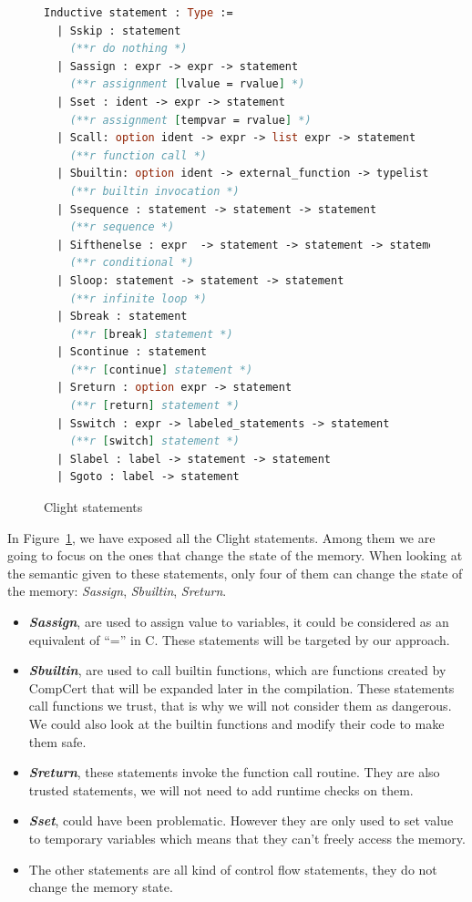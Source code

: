 \documentclass[11pt]{sdm}
\begin{document}
\begin{figure}[!ht]
\centering
\begin{lstlisting}[language=Caml]
Inductive statement : Type :=
  | Sskip : statement
    (**r do nothing *)
  | Sassign : expr -> expr -> statement
    (**r assignment [lvalue = rvalue] *)
  | Sset : ident -> expr -> statement 
    (**r assignment [tempvar = rvalue] *)
  | Scall: option ident -> expr -> list expr -> statement
    (**r function call *)
  | Sbuiltin: option ident -> external_function -> typelist -> list expr -> statement
    (**r builtin invocation *)
  | Ssequence : statement -> statement -> statement 
    (**r sequence *)
  | Sifthenelse : expr  -> statement -> statement -> statement
    (**r conditional *)
  | Sloop: statement -> statement -> statement 
    (**r infinite loop *)
  | Sbreak : statement   
    (**r [break] statement *)
  | Scontinue : statement
    (**r [continue] statement *)
  | Sreturn : option expr -> statement 
    (**r [return] statement *)
  | Sswitch : expr -> labeled_statements -> statement
    (**r [switch] statement *)
  | Slabel : label -> statement -> statement
  | Sgoto : label -> statement
\end{lstlisting}
\caption{Clight statements}
\label{clight_statements}
\end{figure}

In Figure~\ref{clight_statements}, we have exposed all the Clight statements. Among them we are going to focus on the ones that change the state of the memory. When looking at the semantic given to these statements, only four of them can change the state of the memory: \textit{Sassign}, \textit{Sbuiltin}, \textit{Sreturn}.

\begin{itemize}
	\item \textbf{\textit{Sassign}}, are used to assign value to variables, it could be considered as an equivalent of ``='' in C. These statements will be targeted by our approach.
	\item \textbf{\textit{Sbuiltin}}, are used to call builtin functions, which are functions created by CompCert that will be expanded later in the compilation. These statements call functions we trust, that is why we will not consider them as dangerous. We could also look at the builtin functions and modify their code to make them safe.
	\item \textbf{\textit{Sreturn}}, these statements invoke the function call routine. They are also trusted statements, we will not need to add runtime checks on them.
	\item \textbf{\textit{Sset}}, could have been problematic. However they are only used to set value to temporary variables which means that they can't freely access the memory.
	\item The other statements are all kind of control flow statements, they do not change the memory state.
\end{itemize}
\end{document}
